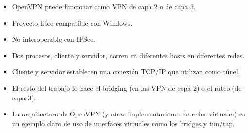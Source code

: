 \begin{itemize}
	\item OpenVPN puede funcionar como VPN de capa 2 o de capa 3. 
	\item Proyecto libre compatible con Windows.
	\item No interoperable con IPSec.
	\item Dos procesos, cliente y servidor, corren en diferentes hosts en diferentes redes. 
	\item Cliente y servidor establecen una conexión TCP/IP que utilizan como túnel.
	\item El resto del trabajo lo hace el bridging (en las VPN de capa 2) o el ruteo (de capa 3). 
	\item La arquitectura de OpenVPN (y otras implementaciones de redes virtuales) es un ejemplo claro de uso de interfaces virtuales como los bridges y tun/tap. 
\end{itemize}

